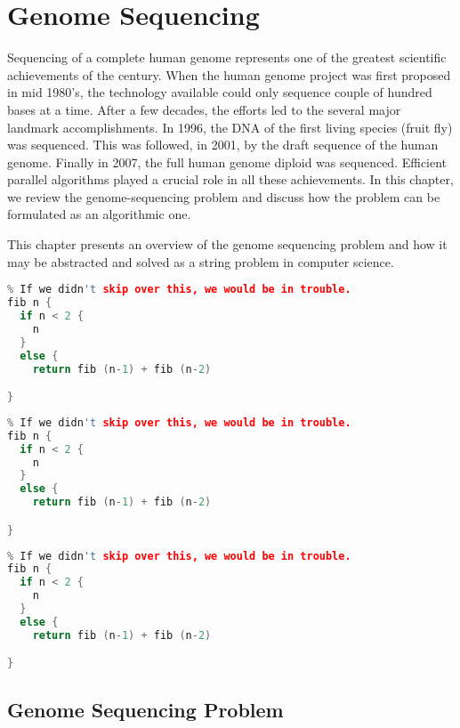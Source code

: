 \chapter{Genome Sequencing}
\label{genome}

\begin{preamble}
Sequencing of a complete human genome represents one of the greatest
scientific achievements of the century.
%
When the human genome project was first proposed in mid 1980's, the
technology available could only sequence couple of hundred bases at a
time.
%
After a few decades, the efforts led to the several major landmark
accomplishments.
%
In 1996, the DNA of the first living species (fruit fly) was sequenced. 
%
This was followed, in 2001, by the draft sequence of the human genome.
%
Finally in 2007, the full human genome diploid was sequenced.
%
Efficient parallel algorithms played a crucial role in all these
achievements.  In this chapter, we review the genome-sequencing
problem and discuss how the problem can be formulated as an
algorithmic one.

This chapter presents an overview of the genome sequencing problem and how it may be abstracted and solved as a string problem in computer science.
\end{preamble}


\begin{lstlisting}[language=c]
% Here is a latex comment
% If we didn't skip over this, we would be in trouble.
fib n {
  if n < 2 {
    n
  }
  else {
    return fib (n-1) + fib (n-2)

}
\end{lstlisting}

\begin{lstlisting}[language=c]
% Here is a latex comment
% If we didn't skip over this, we would be in trouble.
fib n {
  if n < 2 {
    n
  }
  else {
    return fib (n-1) + fib (n-2)

}
\end{lstlisting}

\begin{lstlisting}[language=c]
% Here is a latex comment
% If we didn't skip over this, we would be in trouble.
fib n {
  if n < 2 {
    n
  }
  else {
    return fib (n-1) + fib (n-2)

}
\end{lstlisting}


\section{Genome Sequencing Problem}
\label{genome::prob}

